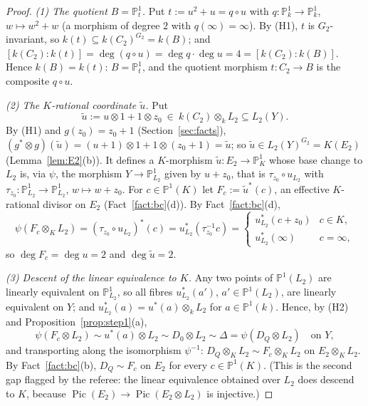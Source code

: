 \documentclass[11pt]{amsart}
\theoremstyle{definition}
\theoremstyle{remark}
\newcommand{\PP}{\mathbb P}
\newcommand{\Pic}{\operatorname{Pic}}
\newcommand{\ut}{\tilde u}
\begin{document}
\begin{proof}
\emph{(1) The quotient $B=\PP^1_t$.} Put $t:=u^2+u=q\circ u$ with $q\colon\PP^1_k\to\PP^1_k$,
$w\mapsto w^2+w$ (a morphism of degree $2$ with $q(\infty)=\infty$). By (H1), $t$ is
$G_2$-invariant, so $k(t)\subseteq k(C_2)^{G_2}=k(B)$; and
$[k(C_2):k(t)]=\deg(q\circ u)=\deg q\cdot\deg u=4=[k(C_2):k(B)]$. Hence $k(B)=k(t)$:
$B=\PP^1_t$, and the quotient morphism $t\colon C_2\to B$ is the composite $q\circ u$.

\emph{(2) The $K$-rational coordinate $\ut$.} Put
\[
\ut:=u\otimes1+1\otimes z_0\ \in\ k(C_2)\otimes_kL_2\subseteq L_2(Y).
\]
By (H1) and $g(z_0)=z_0+1$ (Section~\ref{sec:facts}),
$(g^*\otimes g)(\ut)=(u+1)\otimes1+1\otimes(z_0+1)=\ut$; so $\ut\in L_2(Y)^{G_2}=K(E_2)$
(Lemma~\ref{lem:E2}(b)). It defines a $K$-morphism $\ut\colon E_2\to\PP^1_K$ whose base
change to $L_2$ is, via $\psi$, the morphism $Y\to\PP^1_{L_2}$ given by $u+z_0$, that is
$\tau_{z_0}\circ u_{L_2}$ with $\tau_{z_0}\colon\PP^1_{L_2}\to\PP^1_{L_2}$, $w\mapsto w+z_0$.
For $c\in\PP^1(K)$ let $F_c:=\ut^*(c)$, an effective $K$-rational divisor on $E_2$
(Fact~\ref{fact:bc}(d)). By Fact~\ref{fact:bc}(d),
\[
\psi(F_c\otimes_KL_2)=(\tau_{z_0}\circ u_{L_2})^*(c)=u_{L_2}^*(\tau_{z_0}^{-1}c)=
\begin{cases}u_{L_2}^*(c+z_0)&c\in K,\\ u_{L_2}^*(\infty)&c=\infty,\end{cases}
\]
so $\deg F_c=\deg u=2$ and $\deg\ut=2$.

\emph{(3) Descent of the linear equivalence to $K$.} Any two points of $\PP^1(L_2)$ are
linearly equivalent on $\PP^1_{L_2}$, so all fibres $u_{L_2}^*(a')$, $a'\in\PP^1(L_2)$,
are linearly equivalent on $Y$; and $u_{L_2}^*(a)=u^*(a)\otimes_kL_2$ for $a\in\PP^1(k)$.
Hence, by (H2) and Proposition~\ref{prop:step1}(a),
\[
\psi(F_c\otimes L_2)\sim u^*(a)\otimes L_2\sim D_0\otimes L_2\sim\Delta=\psi(D_Q\otimes L_2)
\quad\text{on }Y,
\]
and transporting along the isomorphism $\psi^{-1}$: $D_Q\otimes_KL_2\sim F_c\otimes_KL_2$
on $E_2\otimes_KL_2$. By Fact~\ref{fact:bc}(b), $D_Q\sim F_c$ on $E_2$ for every
$c\in\PP^1(K)$. (This is the second gap flagged by the referee: the linear equivalence
obtained over $L_2$ does descend to $K$, because $\Pic(E_2)\to\Pic(E_2\otimes L_2)$ is
injective.)


\end{proof}
\end{document}
